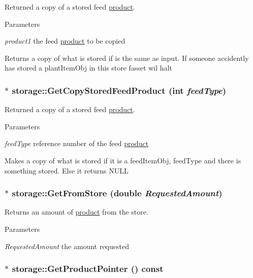 Returned a copy of a stored feed \hyperlink{classproduct}{product}. 
\begin{DoxyParams}{Parameters}
\item[{\em product1}]the feed \hyperlink{classproduct}{product} to be copied\end{DoxyParams}
Returns a copy of what is stored if is the same as input. If someone accidently has stored a plantItemObj in this store fasset wil halt \hypertarget{classstorage_a37cba1ed5c394ab20eeb55d90ccbecc3}{
\subsubsection[{GetCopyStoredFeedProduct}]{ $\ast$ storage::GetCopyStoredFeedProduct (int {\em feedType})}}
\label{classstorage_a37cba1ed5c394ab20eeb55d90ccbecc3}


Returned a copy of a stored feed \hyperlink{classproduct}{product}. 
\begin{DoxyParams}{Parameters}
\item[{\em feedType}]reference number of the feed \hyperlink{classproduct}{product}\end{DoxyParams}
Makes a copy of what is stored if it is a feedItemObj, feedType and there is something stored. Else it returns NULL \hypertarget{classstorage_a3ae7258ab926b5fb4771076bedac543a}{
\subsubsection[{GetFromStore}]{ $\ast$ storage::GetFromStore (double {\em RequestedAmount})}}
\label{classstorage_a3ae7258ab926b5fb4771076bedac543a}


Returns an amount of \hyperlink{classproduct}{product} from the store. 
\begin{DoxyParams}{Parameters}
\item[{\em RequestedAmount}]the amount requested \end{DoxyParams}
\hypertarget{classstorage_a87cffa241a825ff4a09ee71f9d03e04a}{
\subsubsection[{GetProductPointer}]{$\ast$ storage::GetProductPointer () const}}
\label{classstorage_a87cffa241a825ff4a09ee71f9d03e04a}


